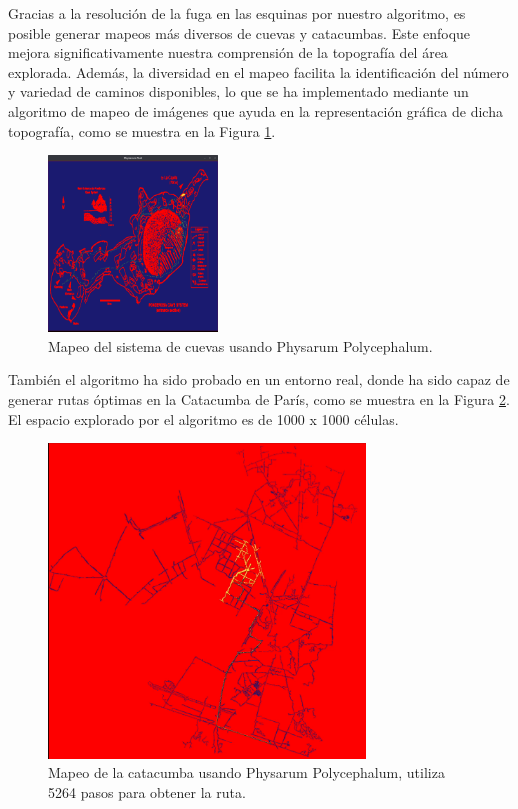     \vskip 0.5cm
    Gracias a la resoluci\'on de la fuga en las esquinas por nuestro algoritmo, es posible generar mapeos m\'as diversos 
        de cuevas y catacumbas. Este enfoque mejora significativamente nuestra comprensi\'on 
        de la topograf\'ia del \'area explorada. Adem\'as, la diversidad en el mapeo facilita la identificaci\'on 
        del n\'umero y variedad de caminos disponibles, lo que se ha implementado mediante un algoritmo de mapeo de im\'agenes que 
        ayuda en la representaci\'on gr\'afica de dicha topograf\'ia, como se muestra en la Figura \ref{fig:CaveSystemPhysarum}.
    \vskip 0.5cm
        \begin{figure}[htbp]
            \centerline{\includegraphics[width=0.40\textwidth]{./images/desarrollo/physarum/CaveSystemPhysarum.png}}
            \caption{Mapeo del sistema de cuevas usando Physarum Polycephalum.}
            \label{fig:CaveSystemPhysarum}
        \end{figure}
        \vskip 0.2cm
        Tambi\'en el algoritmo ha sido probado en un entorno real, donde ha sido capaz de generar 
            rutas \'optimas en la Catacumba de Par\'is, como se muestra en la Figura \ref{fig:Catacomb}. El espacio
            explorado por el algoritmo es de 1000 x 1000 c\'elulas.
        \vskip 0.2cm
        \begin{figure}[htbp]
            \centerline{\includegraphics[width=0.75\textwidth]{./images/desarrollo/physarum/CatacoumbParis.png}}
            \caption{Mapeo de la catacumba usando Physarum Polycephalum, utiliza 5264 pasos para obtener la ruta.}
            \label{fig:Catacomb}
        \end{figure}
